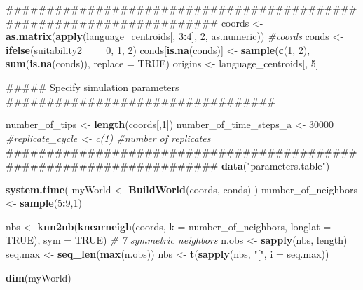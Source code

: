 \documentclass[]{book}
\newenvironment{Shaded}{\begin{snugshade}}{\end{snugshade}}
\newcommand{\KeywordTok}[1]{\textcolor[rgb]{0.13,0.29,0.53}{\textbf{{#1}}}}
\newcommand{\DataTypeTok}[1]{\textcolor[rgb]{0.13,0.29,0.53}{{#1}}}
\newcommand{\DecValTok}[1]{\textcolor[rgb]{0.00,0.00,0.81}{{#1}}}
\newcommand{\StringTok}[1]{\textcolor[rgb]{0.31,0.60,0.02}{{#1}}}
\newcommand{\CommentTok}[1]{\textcolor[rgb]{0.56,0.35,0.01}{\textit{{#1}}}}
\newcommand{\OtherTok}[1]{\textcolor[rgb]{0.56,0.35,0.01}{{#1}}}
\newcommand{\OperatorTok}[1]{\textcolor[rgb]{0.81,0.36,0.00}{\textbf{{#1}}}}
\newcommand{\NormalTok}[1]{{#1}}
\theoremstyle{definition}
\theoremstyle{definition}
\theoremstyle{remark}
\begin{document}
\begin{Shaded}
\begin{Highlighting}[]
{{\NormalTok{#####################################################################}
\NormalTok{coords <-}\StringTok{ }\KeywordTok{as.matrix}\NormalTok{(}\KeywordTok{apply}\NormalTok{(language_centroids[, }\DecValTok{3}\OperatorTok{:}\DecValTok{4}\NormalTok{], }\DecValTok{2}\NormalTok{, as.numeric)) }\CommentTok{#coords}
\NormalTok{conds <-}\StringTok{ }\KeywordTok{ifelse}\NormalTok{(suitability2 }\OperatorTok{==}\StringTok{ }\DecValTok{0}\NormalTok{, }\DecValTok{1}\NormalTok{, }\DecValTok{2}\NormalTok{)}
\NormalTok{conds[}\KeywordTok{is.na}\NormalTok{(conds)] <-}\StringTok{ }\KeywordTok{sample}\NormalTok{(}\KeywordTok{c}\NormalTok{(}\DecValTok{1}\NormalTok{, }\DecValTok{2}\NormalTok{), }\KeywordTok{sum}\NormalTok{(}\KeywordTok{is.na}\NormalTok{(conds)), }\DataTypeTok{replace =} \OtherTok{TRUE}\NormalTok{) }
\NormalTok{origins <-}\StringTok{ }\NormalTok{language_centroids[, }\DecValTok{5}\NormalTok{]}

\NormalTok{##### Specify simulation parameters #################################}

\NormalTok{number_of_tips <-}\StringTok{ }\KeywordTok{length}\NormalTok{(coords[,}\DecValTok{1}\NormalTok{])}
\NormalTok{number_of_time_steps_a <-}\StringTok{ }\DecValTok{30000}
\CommentTok{#replicate_cycle <- c(1)  #number of replicates}
\NormalTok{#####################################################################}
\KeywordTok{data}\NormalTok{(}\StringTok{"parameters.table"}\NormalTok{)}


\KeywordTok{system.time}\NormalTok{(}
\NormalTok{  myWorld <-}\StringTok{ }\KeywordTok{BuildWorld}\NormalTok{(coords, conds)}
\NormalTok{)}
\NormalTok{number_of_neighbors <-}\StringTok{ }\KeywordTok{sample}\NormalTok{(}\DecValTok{5}\OperatorTok{:}\DecValTok{9}\NormalTok{,}\DecValTok{1}\NormalTok{)}

\NormalTok{nbs <-}\StringTok{ }\KeywordTok{knn2nb}\NormalTok{(}\KeywordTok{knearneigh}\NormalTok{(coords, }\DataTypeTok{k =}\NormalTok{ number_of_neighbors, }\DataTypeTok{longlat =} \OtherTok{TRUE}\NormalTok{),}
              \DataTypeTok{sym =} \OtherTok{TRUE}\NormalTok{) }\CommentTok{# 7 symmetric neighbors}
\NormalTok{n.obs <-}\StringTok{ }\KeywordTok{sapply}\NormalTok{(nbs, length)}
\NormalTok{seq.max <-}\StringTok{ }\KeywordTok{seq_len}\NormalTok{(}\KeywordTok{max}\NormalTok{(n.obs))}
\NormalTok{nbs <-}\StringTok{ }\KeywordTok{t}\NormalTok{(}\KeywordTok{sapply}\NormalTok{(nbs, }\StringTok{"["}\NormalTok{, }\DataTypeTok{i =}\NormalTok{ seq.max))}

\KeywordTok{dim}\NormalTok{(myWorld)}


}}
\end{Highlighting}
\end{Shaded}
\end{document}
